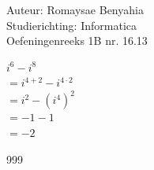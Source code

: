 \documentclass[a4paper]{article}
\begin{document}
  
\noindent \large Auteur: Romaysae Benyahia \\
\noindent \large Studierichting: Informatica\\
\noindent \large Oefeningenreeks 1B nr. 16.13\\

\medskip

\normalsize

$i^6 - i^8$ \\

$= i^{4+2} - i^{4\cdot 2}$ \\

$= i^2 - (i^4)^2$ \\

$= -1 - 1$ \\

$= -2$ \\

\begin{thebibliography}{999}
\end{thebibliography}
\end{document}
